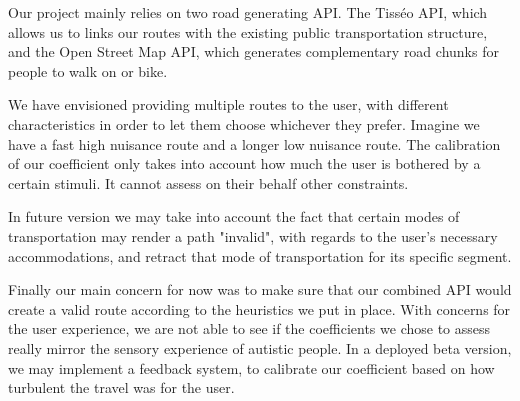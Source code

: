 Our project mainly relies on two road generating API. The Tisséo API, which allows us to links our routes with the existing public transportation structure, and the Open Street Map API, which generates complementary road chunks for people to walk on or bike.
\newline

We have envisioned providing multiple routes to the user, with different characteristics in order to let them choose whichever they prefer. Imagine we have a fast high nuisance route and a longer low nuisance route. The calibration of our coefficient only takes into account how much the user is bothered by a certain stimuli. It cannot assess on their behalf other constraints.
\newline

In future version we may take into account the fact that certain modes of transportation may render a path "invalid", with regards to the user's necessary accommodations, and retract that mode of transportation for its specific segment.
\newline

Finally our main concern for now was to make sure that our combined API would create a valid route according to the heuristics we put in place. With concerns for the user experience, we are not able to see if the coefficients we chose to assess really mirror the sensory experience of autistic people. In a deployed beta version, we may implement a feedback system, to calibrate our coefficient based on how turbulent the travel was for the user.
